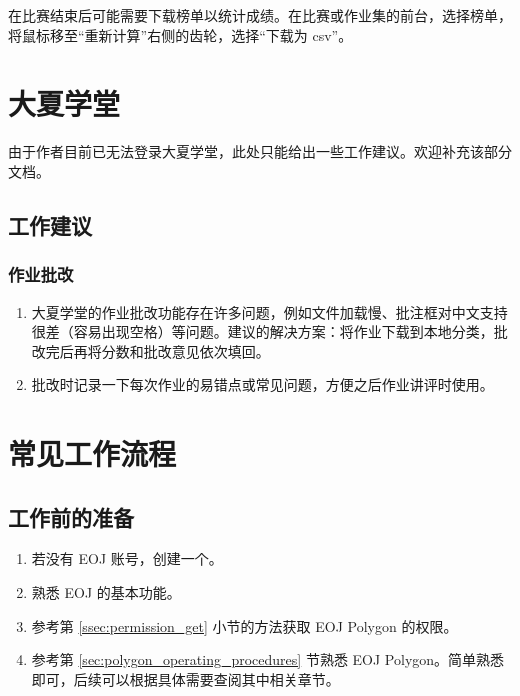\documentclass[oneside]{book}
\begin{document}
\label{ssec:download_ranking_list}

在比赛结束后可能需要下载榜单以统计成绩。在比赛或作业集的前台，选择榜单，将鼠标移至``重新计算''右侧的齿轮，选择``下载为 csv''。

\chapter{大夏学堂}

\label{chap:elearning}


由于作者目前已无法登录大夏学堂，此处只能给出一些工作建议。欢迎补充该部分文档。

\section{工作建议}

\subsection{作业批改}

\begin{enumerate}
  \item 大夏学堂的作业批改功能存在许多问题，例如文件加载慢、批注框对中文支持很差（容易出现空格）等问题。建议的解决方案：将作业下载到本地分类，批改完后再将分数和批改意见依次填回。
  \item 批改时记录一下每次作业的易错点或常见问题，方便之后作业讲评时使用。
\end{enumerate}


\chapter{常见工作流程}

\label{chap:workflow}

\section{工作前的准备}

\begin{enumerate}
  \item 若没有 EOJ 账号，创建一个。
  \item 熟悉 EOJ 的基本功能。
  \item 参考第 \ref{ssec:permission_get} 小节的方法获取 EOJ Polygon 的权限。
  \item 参考第 \ref{sec:polygon_operating_procedures} 节熟悉 EOJ Polygon。简单熟悉即可，后续可以根据具体需要查阅其中相关章节。
\end{enumerate}
\end{document}
